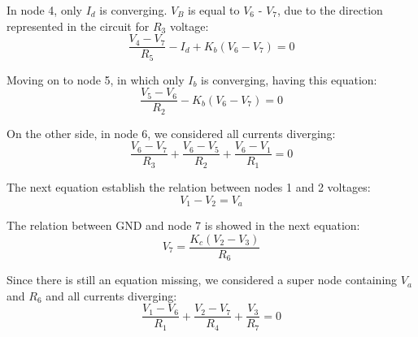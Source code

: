\noindent In node 4, only $I_d$ is converging.
$V_B$ is equal to $V_6$ - $V_7$, due to the direction represented in the circuit for $R_3$ voltage:
\begin{equation}
\frac{V_4 - V_7}{R_5} - I_d + K_b(V_6 - V_7) = 0
  \label{eq:kvl_node4}
\end{equation}

\noindent Moving on to node 5, in which only $I_b$ is converging, having this equation:
\begin{equation}
\frac{V_5 - V_6}{R_2} - K_b(V_6 - V_7) = 0
  \label{eq:kvl_node5}
\end{equation}

\noindent On the other side, in node 6, we considered all currents diverging:
\begin{equation}
\frac{V_6 - V_7}{R_3} + \frac{V_6 - V_5}{R_2} + \frac{V_6 - V_1}{R_1} = 0
  \label{eq:kvl_node6}
\end{equation}

\noindent The next equation establish the relation between nodes 1 and 2 voltages:
\begin{equation}
V_1 - V_2 = V_a
  \label{eq:kvl_node12}
\end{equation}

\noindent The relation between GND and node 7 is showed in the next equation:
\begin{equation}
V_7 = \frac{K_c(V_2 - V_3)}{R_6}
  \label{eq:kvl_node7GND}
\end{equation}

\noindent Since there is still an equation missing, we considered a super node containing $V_a$ and $R_6$ and all currents diverging:
\begin{equation}
\frac{V_1 - V_6}{R_1} + \frac{V_2 - V_7}{R_4} + \frac{V_3}{R_7} = 0
  \label{eq:kvl_supernode}
\end{equation}

